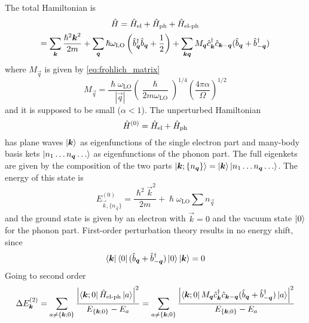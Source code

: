 The total Hamiltonian is
\begin{multline}
    \hat{H} = \hat{H}_\text{el} + \hat{H}_\text{ph} + \hat{H}_\text{el-ph}
    \\ = \sum_{\mathbf{\boldsymbol{k}}} \frac{\hslash^2\mathbf{\boldsymbol{k}}^2}{2m}
    + \sum_{\mathbf{\boldsymbol{q}}} \hslash \omega_\text{LO} \left( \hat{b}^\dagger_{ \mathbf{\boldsymbol{q}}} \hat{b}_{ \mathbf{\boldsymbol{q}}} + \frac{1}{2} \right)
    + \sum_{\mathbf{\boldsymbol{k}}\mathbf{\boldsymbol{q}}} M_{\mathbf{\boldsymbol{q}}}\hat{c}^\dagger_{\mathbf{\boldsymbol{k}}}\hat{c}_{\mathbf{\boldsymbol{k}}-\mathbf{\boldsymbol{q}}} (\hat{b}_{\mathbf{\boldsymbol{q}}} + \hat{b}^\dagger_{-\mathbf{\boldsymbol{q}}})
\end{multline}
where $M_\vec{q}$ is given by \cref{eq:frohlich_matrix}
\begin{equation} \label{eq:frohlich_matrix_perturbation}
    M_\vec{q} =  \frac{\hslash \omega_\text{LO}}{|\vec{q}|} \left(\frac{\hslash}{2m\omega_\text{LO}}\right)^{1/4} \left(\frac{4\pi\alpha}{\Omega}\right)^{1/2}
\end{equation}
and it is supposed to be small ($\alpha < 1$). The unperturbed Hamiltonian
\begin{equation}
    \hat{H}^{(0)} = \hat{H}_\text{el} + \hat{H}_\text{ph}
\end{equation}
has plane waves $\ket{\mathbf{\boldsymbol{k}}}$ as eigenfunctions of the single  electron part and many-body basis kets $\ket{n_1 \dots n_{\mathbf{\boldsymbol{q}}} \dots}$ as eigenfunctions of the phonon part. The full eigenkets are given by the composition of the two parts $\ket{\mathbf{\boldsymbol{k}}; \{n_{\mathbf{\boldsymbol{q}}}\}} = \ket{\mathbf{\boldsymbol{k}}}\ket{n_1 \dots n_{\mathbf{\boldsymbol{q}}} \dots}$. The energy of this state is
\begin{equation}
    E_{\vec{k}, \{n_\vec{q}\}}^{(0)} = \frac{\hslash^2\vec{k}^2}{2m} + \hslash \omega_\text{LO}\sum n_\vec{q}
\end{equation}
and the ground state is given by an electron with $\vec{k}=0$ and the vacuum state $\ket{0}$ for the phonon part.
First-order perturbation theory results in no energy shift, since
\begin{equation}
    \bra{\mathbf{\boldsymbol{k}}}\bra{0}(\hat{b}_{\mathbf{\boldsymbol{q}}} + \hat{b}^\dagger_{-\mathbf{\boldsymbol{q}}})\ket{0}\ket{\mathbf{\boldsymbol{k}}} = 0
\end{equation}
Going to second order
\begin{equation}
    \Delta E_{\mathbf{\boldsymbol{k}}}^{(2)} = \sum_{a\neq{\{\mathbf{\boldsymbol{k}};0\}}} \frac{\left|\bra{\mathbf{\boldsymbol{k}};0}\hat{H}_\text{el-ph}\ket{a}\right|^2}{E_{\{\mathbf{\boldsymbol{k}};0\}} - E_a}
    = \sum_{a\neq{\{\mathbf{\boldsymbol{k}};0\}}} \frac{\left|\bra{\mathbf{\boldsymbol{k}};0} M_{\mathbf{\boldsymbol{q}}}\hat{c}^\dagger_{\mathbf{\boldsymbol{k}}}\hat{c}_{\mathbf{\boldsymbol{k}}-\mathbf{\boldsymbol{q}}} (\hat{b}_{\mathbf{\boldsymbol{q}}} + \hat{b}^\dagger_{-\mathbf{\boldsymbol{q}}})\ket{a}\right|^2}{E_{\{\mathbf{\boldsymbol{k}};0\}} - E_a}
\end{equation}
